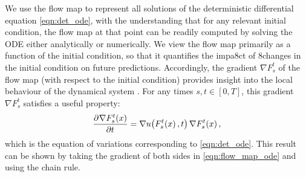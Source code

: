 We use the flow map to represent all solutions of the deterministic differential equation \cref{eqn:det_ode}, with the understanding that for any relevant initial condition, the flow map at that point can be readily computed by solving the ODE either analytically or numerically.
We view the flow map primarily as a function of the initial condition, so that it quantifies the impa8ct of 8changes in the initial condition on future predictions.
Accordingly, the gradient \(\nabla F_s^t\) of the flow map (with respect to the initial condition) provides insight into the local behaviour of the dynamical system \citep{Arnold_1973_OrdinaryDifferentialEquations,TruesdellNoll_2004_NonLinearFieldTheories}.
For any times \(s, t \in [0,T]\), this gradient	\(\nabla F_s^t\) satisfies a useful property:
\begin{equation}
	\dpd{\nabla F_{s}^{t}\!\left(x\right)}{t} = \nabla u\!\left(F_{s}^{t}\!\left(x\right), t\right) \nabla F_{s}^{t}\!\left(x\right),
	\label{eqn:eqn_of_variations}
\end{equation}
which is the equation of variations corresponding to \cref{eqn:det_ode}.
This result can be shown by taking the gradient of both sides in \cref{eqn:flow_map_ode} and using the chain rule.




